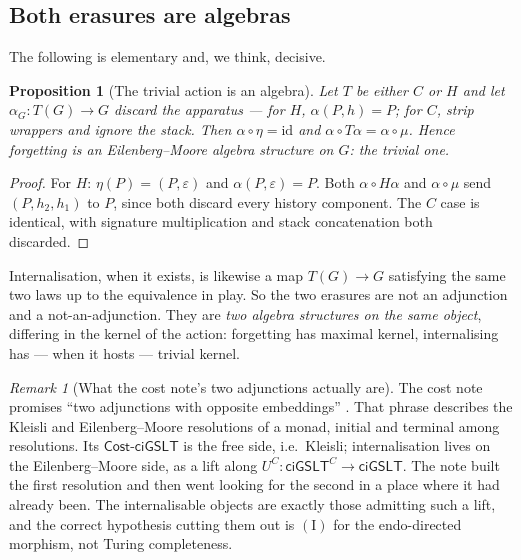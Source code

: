 \documentclass[11pt,a4paper]{article}
\theoremstyle{definition}
\theoremstyle{plain}
\newtheorem{proposition}[definition]{Proposition}
\theoremstyle{remark}
\newtheorem{remark}[definition]{Remark}
\newcommand{\ciG}{\mathsf{ciGSLT}}
\newcommand{\id}{\mathrm{id}}
\newcommand{\Icond}{(\mathrm{I})}
\begin{document}
\subsection{Both erasures are algebras}

The following is elementary and, we think, decisive.

\begin{proposition}[The trivial action is an algebra]
\label{prop:trivial}
Let $T$ be either $C$ or $H$ and let $\alpha_G : T(G) \to G$ discard the apparatus --- for $H$,
$\alpha(P,h) = P$; for $C$, strip wrappers and ignore the stack. Then $\alpha \circ \eta = \id$ and
$\alpha \circ T\alpha = \alpha \circ \mu$. Hence forgetting is an Eilenberg--Moore algebra structure
on $G$: the trivial one.
\end{proposition}

\begin{proof}
For $H$: $\eta(P) = (P,\varepsilon)$ and $\alpha(P,\varepsilon) = P$. Both $\alpha \circ H\alpha$ and
$\alpha \circ \mu$ send $(P, h_2, h_1)$ to $P$, since both discard every history component. The $C$
case is identical, with signature multiplication and stack concatenation both discarded.
\end{proof}

Internalisation, when it exists, is likewise a map $T(G) \to G$ satisfying the same two laws up to
the equivalence in play. So the two erasures are not an adjunction and a not-an-adjunction. They are
\emph{two algebra structures on the same object}, differing in the kernel of the action: forgetting
has maximal kernel, internalising has --- when it hosts --- trivial kernel.

\begin{remark}[What the cost note's two adjunctions actually are]
\label{rmk:kleisli-em}
The cost note promises ``two adjunctions with opposite embeddings'' \cite[\S9]{cost}. That phrase
describes the Kleisli and Eilenberg--Moore resolutions of a monad, initial and terminal among
resolutions. Its $\mathsf{Cost}\text{-}\ciG$ is the free side, i.e.\ Kleisli; internalisation lives
on the Eilenberg--Moore side, as a lift along $U^C : \ciG^{C} \to \ciG$. The note built the first
resolution and then went looking for the second in a place where it had already been. The
internalisable objects are exactly those admitting such a lift, and the correct hypothesis cutting
them out is $\Icond$ for the endo-directed morphism, not Turing completeness.
\end{remark}
\end{document}
